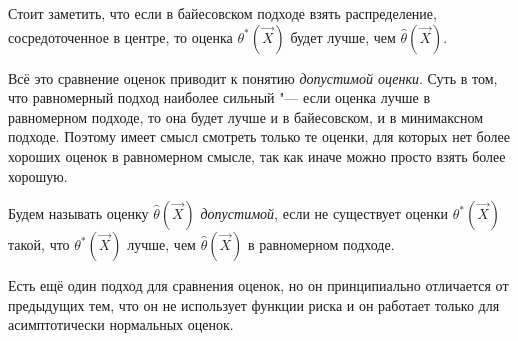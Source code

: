 Стоит заметить, что если в байесовском подходе взять распределение, сосредоточенное в центре, то оценка $\theta^{*}(\vec{X})$ будет лучше, чем $\hat{\theta}(\vec{X})$.

Всё это сравнение оценок приводит к понятию \emph{допустимой оценки}. Суть в том, что равномерный подход наиболее сильный "--- если оценка лучше в равномерном подходе, то она будет лучше и в байесовском, и в минимаксном подходе. Поэтому имеет смысл смотреть только те оценки, для которых нет более хороших оценок в равномерном смысле, так как иначе можно просто взять более хорошую.
\begin{definition}
	Будем называть оценку $\hat{\theta}(\vec{X})$ \emph{допустимой}, если не существует оценки $\theta^{*}(\vec{X})$ такой, что $\theta^{*}(\vec{X})$ лучше, чем $\hat{\theta}(\vec{X})$ в равномерном подходе.
\end{definition}

Есть ещё один подход для сравнения оценок, но он принципиально отличается от предыдущих тем, что он не использует функции риска и он работает только для асимптотически нормальных оценок.

